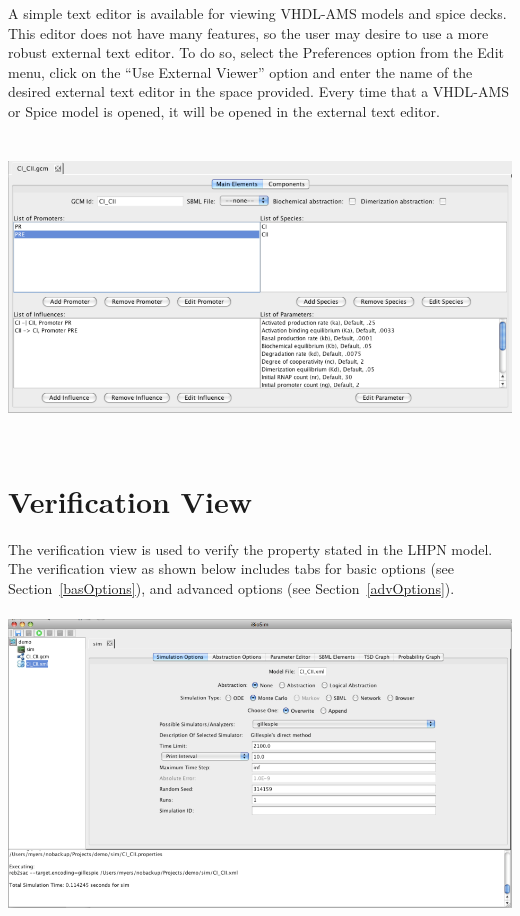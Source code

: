 \documentclass[titlepage,11pt]{article}
\begin{document}
\noindent
A simple text editor is available for viewing VHDL-AMS models and spice decks.
This editor does not have many features, so the user may desire to use a  more
robust external text editor.  To do so, select the Preferences option from the
Edit menu, click on the ``Use External Viewer'' option and enter the name of
the desired external text editor in the space provided.  Every time that a 
VHDL-AMS or Spice model is opened, it will be opened in the external text 
editor.
\begin{center}
\includegraphics[height=80mm]{screenshots/GCMedit}
\end{center}
\clearpage

\section{\label{Verification}Verification View}

\noindent
The verification view is used to verify the property stated in the LHPN model.
 The verification view as shown below includes tabs for 
basic options (see Section~\ref{basOptions}),  and
advanced options (see Section~\ref{advOptions}).
\begin{center}
\includegraphics[height=80mm]{screenshots/analysisView}
\end{center}
\end{document}
